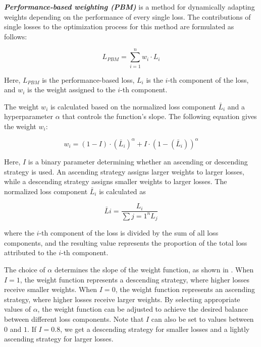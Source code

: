 \textbf{\emph{Performance-based weighting (PBM)}} is a method for dynamically adapting weights depending on the performance of every single loss. The contributions of single losses to the optimization process for this method are formulated as follows:

\begin{equation}
  L_{PBM} = \sum_{i=1}^n w_i \cdot L_i
  \label{eqn:annealing}
\end{equation}

Here, $L_{PBM}$ is the performance-based loss, $L_i$ is the $i$-th component of the loss, and $w_i$ is the weight assigned to the $i$-th component.

The weight $w_i$ is calculated based on the normalized loss component $\bar{L}_i$ and a hyperparameter $\alpha$ that controls the function's slope. The following equation gives the weight $w_i$:

\begin{equation}
  w_i=(1-I)\cdot(\bar{L}_i)^{\alpha}+I\cdot(1-(\bar{L}_i))^{\alpha}
\end{equation}

Here, $I$ is a binary parameter determining whether an ascending or descending strategy is used. An ascending strategy assigns larger weights to larger losses, while a descending strategy assigns smaller weights to larger losses. The normalized loss component $\bar{L}_i$ is calculated as

\begin{equation}
  \bar{L}i=\frac{L_i}{\sum{j=1}^n L_j}
\end{equation}

where the $i$-th component of the loss is divided by the sum of all loss components, and the resulting value represents the proportion of the total loss attributed to the $i$-th component.

The choice of $\alpha$ determines the slope of the weight function, as shown in . When $I=1$, the weight function represents a descending strategy, where higher losses receive smaller weights. When $I=0$, the weight function represents an ascending strategy, where higher losses receive larger weights. By selecting appropriate values of $\alpha$, the weight function can be adjusted to achieve the desired balance between different loss components. Note that $I$ can also be set to values between $0$ and $1$. If $I=0.8$, we get a descending strategy for smaller losses and a lightly ascending strategy for larger losses.


